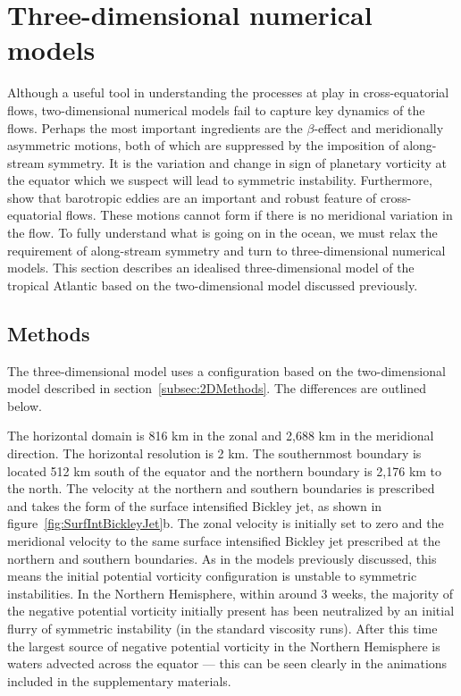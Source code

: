 \section{Three-dimensional numerical models}
Although a useful tool in understanding the processes at play in cross-equatorial flows, two-dimensional numerical models fail to capture key dynamics of the flows.
Perhaps the most important ingredients are the $\beta$-effect and meridionally asymmetric motions, both of which are suppressed by the imposition of along-stream symmetry. It is the variation and change in sign of planetary vorticity at the equator which we suspect will lead to symmetric instability. Furthermore,~\citet{Edwards1998II} show that barotropic eddies are an important and robust feature of cross-equatorial flows. These motions cannot form if there is no meridional variation in the flow. To fully understand what is going on in the ocean, we must relax the requirement of along-stream symmetry and turn to three-dimensional numerical models. This section describes an idealised three-dimensional model of the tropical Atlantic based on the two-dimensional model discussed previously.

\subsection{Methods}
The three-dimensional model uses a configuration based on the two-dimensional model described in section~\ref{subsec:2DMethods}. The differences are outlined below.

The horizontal domain is 816 km in the zonal and 2,688 km in the meridional direction. The horizontal resolution is 2 km. The southernmost boundary is located 512 km south of the equator and the northern boundary is 2,176 km to the north. The velocity at the northern and southern boundaries is prescribed and takes the form of the surface intensified Bickley jet, as shown in figure~\ref{fig:SurfIntBickleyJet}b. The zonal velocity is initially set to zero and the meridional velocity to the same surface intensified Bickley jet prescribed at the northern and southern boundaries. As in the models previously discussed, this means the initial potential vorticity configuration is unstable to symmetric instabilities. In the Northern Hemisphere, within around 3 weeks, the majority of the negative potential vorticity initially present has been neutralized by an initial flurry of symmetric instability (in the standard viscosity runs). After this time the largest source of negative potential vorticity in the Northern Hemisphere is waters advected across the equator --- this can be seen clearly in the animations included in the supplementary materials.


